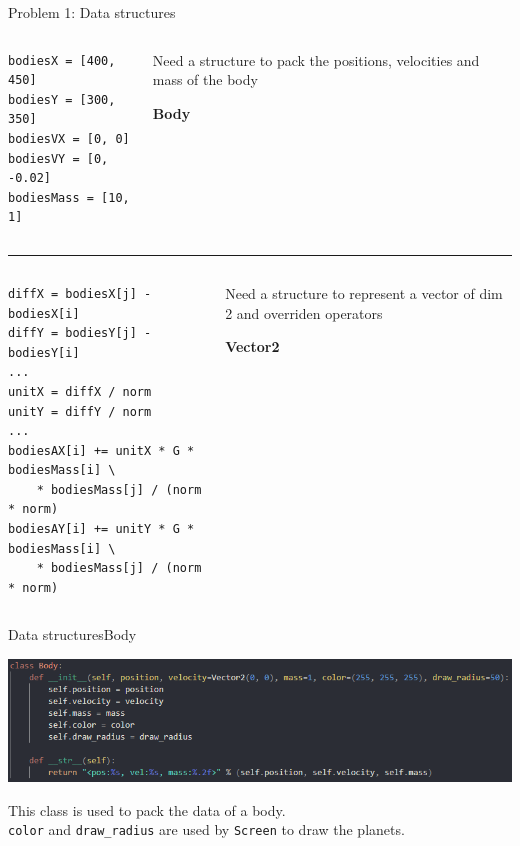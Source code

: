 \documentclass[colorlinks]{beamer}
\begin{document}
\begin{frame}[fragile]{Problem 1: Data structures}
    \footnotesize
    
    
    \begin{columns}
        \begin{column}{.6\textwidth}
        \begin{verbatim}
bodiesX = [400, 450]
bodiesY = [300, 350]
bodiesVX = [0, 0]
bodiesVY = [0, -0.02]
bodiesMass = [10, 1]
        \end{verbatim}
        \end{column}
        \begin{column}{.4\textwidth}
            Need a structure to pack the positions, velocities and mass of the body
            
            \centering\textbf{Body}
        \end{column}
    \end{columns}

        \vspace{1em}
        \rule{\textwidth}{0.1pt}

    \begin{columns}
        \begin{column}{.6\textwidth}
        \begin{verbatim}
diffX = bodiesX[j] - bodiesX[i]
diffY = bodiesY[j] - bodiesY[i]
...
unitX = diffX / norm
unitY = diffY / norm
...
bodiesAX[i] += unitX * G * bodiesMass[i] \
    * bodiesMass[j] / (norm * norm)
bodiesAY[i] += unitY * G * bodiesMass[i] \
    * bodiesMass[j] / (norm * norm)
        \end{verbatim}
        \end{column}
        \begin{column}{.4\textwidth}
            Need a structure to represent a vector of dim 2 and overriden operators

            \centering\textbf{Vector2}
        \end{column}
    \end{columns}
\end{frame}

\begin{frame}{Data structures}{Body}
    {
        \centering
        \includegraphics[width=\textwidth]{Body.png}
        \par
    }

    This class is used to pack the data of a body. \\
    
    \texttt{color} and \texttt{draw_radius} are used by \texttt{Screen} to draw the planets.
\end{frame}
\end{document}
